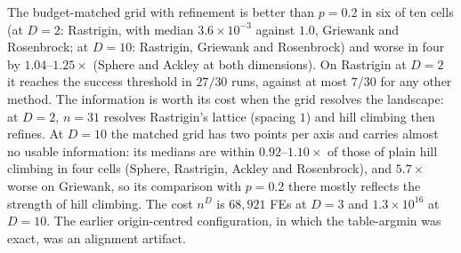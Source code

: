 \documentclass[conference]{IEEEtran}
\begin{document}
The budget-matched grid with refinement is better than $p=0.2$ in six of ten cells (at $D=2$: Rastrigin, with median $3.6\times10^{-3}$ against $1.0$, Griewank and Rosenbrock; at $D=10$: Rastrigin, Griewank and Rosenbrock) and worse in four by $1.04$--$1.25\times$ (Sphere and Ackley at both dimensions). On Rastrigin at $D=2$ it reaches the success threshold in $27/30$ runs, against at most $7/30$ for any other method. The information is worth its cost when the grid resolves the landscape: at $D=2$, $n=31$ resolves Rastrigin's lattice (spacing $1$) and hill climbing then refines. At $D=10$ the matched grid has two points per axis and carries almost no usable information: its medians are within $0.92$--$1.10\times$ of those of plain hill climbing in four cells (Sphere, Rastrigin, Ackley and Rosenbrock), and $5.7\times$ worse on Griewank, so its comparison with $p=0.2$ there mostly reflects the strength of hill climbing. The cost $n^D$ is $68{,}921$ FEs at $D=3$ and $1.3\times10^{16}$ at $D=10$. The earlier origin-centred configuration, in which the table-argmin was exact, was an alignment artifact.
\end{document}
